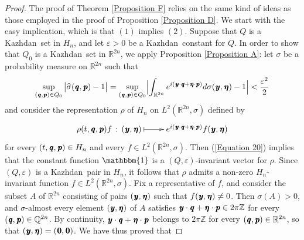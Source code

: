 \documentclass[11pt,english,a4paper]{smfart}
\numberwithin{equation}{section}
\theoremstyle{definition}
\begin{document}
\begin{proof}
 The proof of Theorem \ref{Proposition F} relies on the same kind of ideas as those employed in the proof of Proposition \ref{Proposition D}. We start with the easy implication, which is that $(1)$ implies $(2)$. Suppose that ${Q}$  is a {Kazhdan}\ set in $H_{n}$, and let $\varepsilon >0$ be a {Kazhdan}\ constant for ${Q}$. In order to show that ${Q}_{0}$ is a {Kazhdan}\ set in ${\ensuremath{\mathbb R}}^{2n}$, we apply Proposition \ref{Proposition A}: let $\sigma $ be a probability measure on ${\ensuremath{\mathbb R}}^{2n}$ such that
\begin{equation}\label{Equation 20}
 \sup_{({\mkern 1.5 mu\pmb{q}},{\mkern 1.5 mu\pmb{p}})\in{Q}_{0}}\,\bigl|\widehat{\sigma }({\mkern 1.5 mu\pmb{q}},{\mkern 1.5 mu\pmb{p}})-1\bigr|=\sup_{({\mkern 1.5 mu\pmb{q}},{\mkern 1.5 mu\pmb{p}})\in{Q}_{0}}
\Bigl|\int_{{\ensuremath{\mathbb R}}^{2n}}e^{i({\mkern 1.5 mu\pmb{y}}\cdot {\mkern 1.5 mu\pmb{q}}+{\mkern 1.5 mu\pmb{\eta}} \cdot{\mkern 1.5 mu\pmb{p}})}d\sigma ({\mkern 1.5 mu\pmb{y}},{\mkern 1.5 mu\pmb{\eta}} )-1\Bigr|<\dfrac{\varepsilon^{2}}{2} 
\end{equation}
and consider the representation $\rho $ of $H_{n}$ on $L^{2}({\ensuremath{\mathbb R}}^{2n},\sigma )$ defined by 
\[
\xymatrix{
\rho (t,{\mkern 1.5 mu\pmb{q}},{\mkern 1.5 mu\pmb{p}})f\,:\,({\mkern 1.5 mu\pmb{y}},{\mkern 1.5 mu\pmb{\eta}} )\ar@{|->}[r]&e^{i({\mkern 1.5 mu\pmb{y}}\cdot{\mkern 1.5 mu\pmb{q}}+{\mkern 1.5 mu\pmb{\eta}} \cdot{\mkern 1.5 mu\pmb{p}})}f({\mkern 1.5 mu\pmb{y}},{\mkern 1.5 mu\pmb{\eta}} )
}
\]
for every $(t,{\mkern 1.5 mu\pmb{q}},{\mkern 1.5 mu\pmb{p}})\in H_{n}$ and every $f\in L^{2}({\ensuremath{\mathbb R}}^{2n},\sigma )$. Then (\ref{Equation 20}) implies that the constant function $\mathbbm{1}$ is a $({Q},\varepsilon )$-invariant vector for $\rho $. Since $({Q},\varepsilon )$ is a {Kazhdan}\ pair in $H_{n}$, it follows that $\rho $ admits a non-zero $H_{n}$-invariant function $f\in L^{2}({\ensuremath{\mathbb R}}^{2n},\sigma )$. Fix a representative of $f$, and consider the subset $A$ of ${\ensuremath{\mathbb R}}^{2n}$ consisting of pairs $({\mkern 1.5 mu\pmb{y}},{\mkern 1.5 mu\pmb{\eta}})$ such that $f({\mkern 1.5 mu\pmb{y}},{\mkern 1.5 mu\pmb{\eta}} )\neq 0$. Then $\sigma (A)>0$, and $\sigma $-almost every element $({\mkern 1.5 mu\pmb{y}},{\mkern 1.5 mu\pmb{\eta}} )$ of $A$ satisfies ${\mkern 1.5 mu\pmb{y}}\cdot{\mkern 1.5 mu\pmb{q}}+{\mkern 1.5 mu\pmb{\eta}} \cdot{\mkern 1.5 mu\pmb{p}}\in 2\pi {\ensuremath{\mathbb Z}}$ for every $({\mkern 1.5 mu\pmb{q}},{\mkern 1.5 mu\pmb{p}})\in{\ensuremath{\mathbb Q}}^{2n}$. By continuity, ${\mkern 1.5 mu\pmb{y}}\cdot{\mkern 1.5 mu\pmb{q}}+{\mkern 1.5 mu\pmb{\eta}} \cdot{\mkern 1.5 mu\pmb{p}}$ belongs to $2\pi {\ensuremath{\mathbb Z}}$ for every $({\mkern 1.5 mu\pmb{q}},{\mkern 1.5 mu\pmb{p}})\in{\ensuremath{\mathbb R}}^{2n}$, so that $({\mkern 1.5 mu\pmb{y}},{\mkern 1.5 mu\pmb{\eta}} )=({\mkern 1.5 mu\pmb{0}},{\mkern 1.5 mu\pmb{0}})$. We have thus proved that 

\end{proof}
\end{document}
